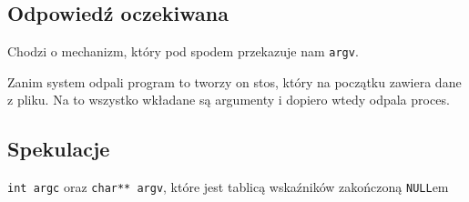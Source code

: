 \subsection{Odpowiedź oczekiwana}
Chodzi o mechanizm, który pod spodem przekazuje nam \texttt{argv}.

Zanim system odpali program to tworzy on stos, który na początku zawiera dane z pliku.
Na to wszystko wkładane są argumenty i dopiero wtedy odpala proces.

\subsection{Spekulacje}
\texttt{int argc} oraz \texttt{char** argv}, które jest tablicą wskaźników zakończoną \texttt{NULL}em